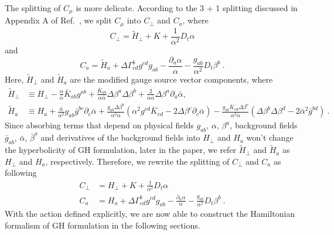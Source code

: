 The splitting of $C_{\mu}$ is more delicate. According to the 3 + 1 splitting discussed in Appendix A of Ref.~\cite{Brown:2011qg}, we split $C_{\mu}$ into $C_{\perp}$ and $C_{a}$, where
\begin{equation}
C_{\perp} = {\tilde H}_{\perp} + K + \frac{1}{\alpha^{2}}D_{t}\alpha
\end{equation}
and
\begin{equation}
C_{a} = {\tilde H}_{a} + \Delta \Gamma^{b}_{cd}g^{cd}g_{ab} - \frac{\partial_{a}\alpha}{\alpha} - \frac{g_{ab}}{\alpha^2}D_{t}\beta^{b} \ .
\end{equation}
Here, ${\tilde H}_{\perp}$ and ${\tilde H}_{a}$ are the modified gauge source vector components, where
\begin{subequations}
\begin{align}
{\tilde H}_{\perp} & \equiv H_{\perp} - \frac{\alpha}{{\bar \alpha}}{\bar K}_{ab}g^{ab} + \frac{{\bar K}_{ab}}{\alpha{\bar \alpha}}\Delta \beta^{a} \Delta \beta^{b} + \frac{2}{\alpha {\bar \alpha}}\Delta \beta^{a} \partial_{a}{\bar \alpha}, \\
{\tilde H}_{a} & \equiv H_{a} + \frac{{\bar \alpha}}{\alpha^2}g_{ab}{\bar g}^{bc}\partial_{c}{\bar \alpha} + \frac{g_{ab}\Delta \beta^{b}}{\alpha^2 {\bar \alpha}}(\alpha^2g^{cd}{\bar K}_{cd} - 2\Delta\beta^{c}\partial_{c}{\bar \alpha}) - \frac{g_{ab}{\bar K}_{cd}\Delta \beta^{c}}{\alpha^2{\bar \alpha}}(\Delta \beta^{b}\Delta \beta^{d} - 2{\bar \alpha}^2{\bar g}^{bd}) \ .
\end{align}
\end{subequations}
Since absorbing terms that depend on physical fields $g_{ab}$, $\alpha$, $\beta^{a}$, background fields ${\bar g}_{ab}$, ${\bar \alpha}$, ${\bar \beta}^{a}$ and derivatives of the background fields into $H_{\perp}$ and $H_{a}$ won't change the hyperbolicity of GH formulation\cite{Brown:2011qg}, later in the paper, we refer ${\tilde H}_{\perp}$ and ${\tilde H}_{a}$ as $H_{\perp}$ and $H_{a}$, respectively. Therefore, we rewrite the splitting of $C_{\perp}$ and $C_{a}$ as following
\begin{subequations}
\begin{align}
C_{\perp} & = H_{\perp} + K + \frac{1}{\alpha^{2}}D_{t}\alpha\\
C_{a} & = H_{a} + \Delta \Gamma^{b}_{cd}g^{cd}g_{ab} - \frac{\partial_{a}\alpha}{\alpha} - \frac{g_{ab}}{\alpha^2}D_{t}\beta^{b} \ .
\end{align}
\end{subequations}
With the action defined explicitly, we are now able to construct the Hamiltonian formalism of GH formulation in the following sections. 
